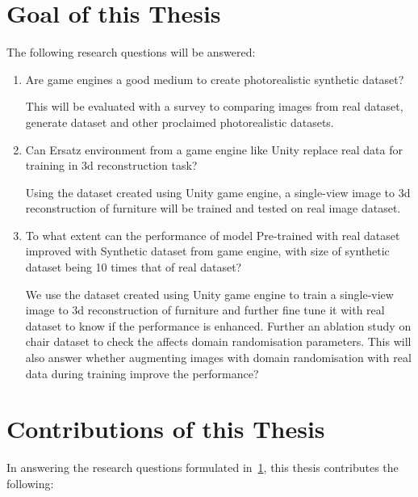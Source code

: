 \section{Goal of this Thesis}\label{sec:goal}

The following research questions will be answered:
\begin{enumerate}
    \item Are game engines a good medium to create photorealistic synthetic dataset?

    This will be evaluated with a survey to comparing images from real dataset, generate dataset and other proclaimed photorealistic datasets.

    \item Can Ersatz environment from a game engine like Unity replace real data for training in 3d reconstruction task?

    Using the dataset created using Unity game engine, a single-view image to 3d reconstruction of furniture will be trained and tested on real image dataset.

    \item To what extent can the performance of model Pre-trained with real dataset improved with Synthetic dataset from game engine,
            with size of synthetic dataset being 10 times that of real dataset?

    We use the dataset created using Unity game engine to train a single-view image to 3d reconstruction of furniture and further fine tune it with real dataset to know if the performance is enhanced.
    Further an ablation study on chair dataset to check the affects domain randomisation parameters.
    This will also answer whether augmenting images with domain randomisation with real data during training improve the performance?

\end{enumerate}

\section{Contributions of this Thesis}\label{sec:contributions}
In answering the research questions formulated in~\ref{sec:goal}, this thesis contributes the following:

